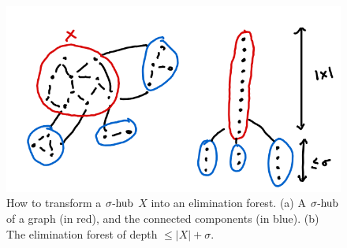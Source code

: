 \begin{figure}
    \centering
    \includegraphics[width=.6\textwidth]{figures/shub-to-treedepth.png}
    \caption{How to transform a $\sigma\text{-hub}$ $X$ into an elimination forest. (a) A $\sigma\text{-hub}$ of a graph (in red), and the connected components (in blue). (b) The elimination forest of depth $\leq |X| + \sigma$.}
    \label{fig:shub-to-treedepth}
\end{figure}